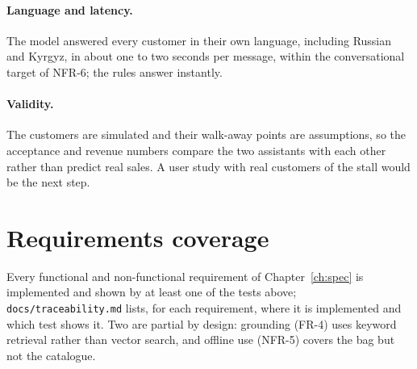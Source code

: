 \paragraph{Language and latency.} The model answered every customer in their own language, including Russian and
Kyrgyz, in about one to two seconds per message, within the conversational target of NFR-6; the rules answer instantly.

\paragraph{Validity.} The customers are simulated and their walk-away points are assumptions, so the acceptance and
revenue numbers compare the two assistants with each other rather than predict real sales. A user study with real
customers of the stall would be the next step.

\section{Requirements coverage}

Every functional and non-functional requirement of Chapter~\ref{ch:spec} is implemented and shown by at least one of the
tests above; \texttt{docs/traceability.md} lists, for each requirement, where it is implemented and which test shows it.
Two are partial by design: grounding (FR-4) uses keyword retrieval rather than vector search, and offline use (NFR-5)
covers the bag but not the catalogue.
